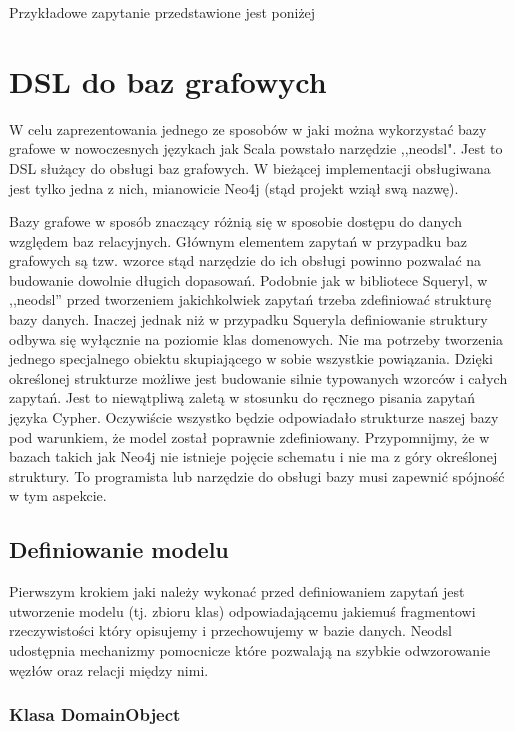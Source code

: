 \documentclass[brudnopis]{xmgr}
\begin{document}
Przykładowe zapytanie przedstawione jest poniżej



\chapter{DSL do baz grafowych}

W celu zaprezentowania jednego ze sposobów w jaki można wykorzystać bazy grafowe w nowoczesnych językach jak Scala powstało narzędzie ,,neodsl". Jest to DSL służący do obsługi baz grafowych. W bieżącej implementacji obsługiwana jest tylko jedna z nich, mianowicie Neo4j (stąd projekt wziął swą nazwę). 

Bazy grafowe w sposób znaczący różnią się w sposobie dostępu do danych względem baz relacyjnych. Głównym elementem zapytań w przypadku baz grafowych są tzw. wzorce stąd narzędzie do ich obsługi powinno pozwalać na budowanie dowolnie długich dopasowań. Podobnie jak w bibliotece Squeryl, w ,,neodsl'' przed tworzeniem jakichkolwiek zapytań trzeba zdefiniować strukturę bazy danych. Inaczej jednak niż w przypadku Squeryla definiowanie struktury odbywa się wyłącznie na poziomie klas domenowych. Nie ma potrzeby tworzenia jednego specjalnego obiektu skupiającego w sobie wszystkie powiązania. Dzięki określonej strukturze możliwe jest budowanie silnie typowanych wzorców i całych zapytań. Jest to niewątpliwą zaletą w stosunku do ręcznego pisania zapytań języka Cypher. Oczywiście wszystko będzie odpowiadało strukturze naszej bazy pod warunkiem, że model został poprawnie zdefiniowany. Przypomnijmy, że w bazach takich jak Neo4j nie istnieje pojęcie schematu i nie ma z góry określonej struktury. To programista lub narzędzie do obsługi bazy musi zapewnić spójność w tym aspekcie.

\section{Definiowanie modelu}

Pierwszym krokiem jaki należy wykonać przed definiowaniem zapytań jest utworzenie modelu (tj. zbioru klas) odpowiadającemu jakiemuś fragmentowi rzeczywistości który opisujemy i przechowujemy w bazie danych. Neodsl udostępnia mechanizmy pomocnicze które pozwalają na szybkie odwzorowanie węzłów oraz relacji między nimi.

\subsection{Klasa DomainObject}
\end{document}
